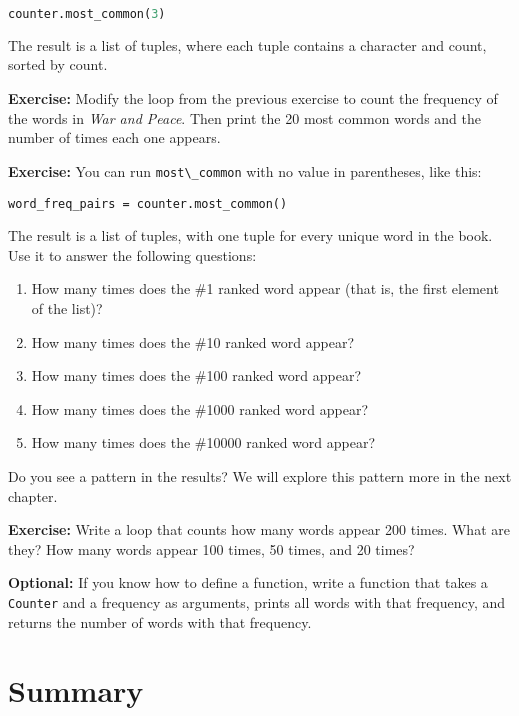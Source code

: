 \begin{lstlisting}[language=Python,style=source]
counter.most_common(3)
\end{lstlisting}

The result is a list of tuples, where each tuple contains a character
and count, sorted by count.

\textbf{Exercise:} Modify the loop from the previous exercise to count
the frequency of the words in \emph{War and Peace}. Then print the 20
most common words and the number of times each one appears.

\textbf{Exercise:} You can run \passthrough{\lstinline!most\_common!}
with no value in parentheses, like this:

\begin{lstlisting}[style=output]
word_freq_pairs = counter.most_common()
\end{lstlisting}

The result is a list of tuples, with one tuple for every unique word in
the book. Use it to answer the following questions:

\begin{enumerate}
\def\labelenumi{\arabic{enumi}.}
\item
  How many times does the \#1 ranked word appear (that is, the first
  element of the list)?
\item
  How many times does the \#10 ranked word appear?
\item
  How many times does the \#100 ranked word appear?
\item
  How many times does the \#1000 ranked word appear?
\item
  How many times does the \#10000 ranked word appear?
\end{enumerate}

Do you see a pattern in the results? We will explore this pattern more
in the next chapter.

\textbf{Exercise:} Write a loop that counts how many words appear 200
times. What are they? How many words appear 100 times, 50 times, and 20
times?

\textbf{Optional:} If you know how to define a function, write a
function that takes a \passthrough{\lstinline!Counter!} and a frequency
as arguments, prints all words with that frequency, and returns the
number of words with that frequency.

\hypertarget{summary}{%
\section{Summary}\label{summary}}

